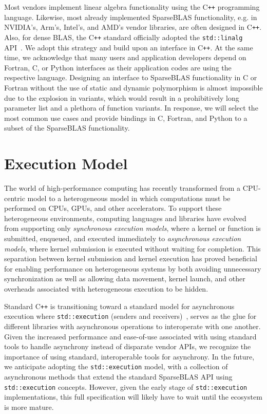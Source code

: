 \documentclass[manuscript,review]{acmart}
\newcommand{\cplusplus}{C\texttt{++}\xspace}
\begin{document}
Most vendors implement linear algebra functionality using the
\cplusplus programming language. Likewise, most already implemented
SparseBLAS functionality, e.g. in NVIDIA's, Arm's, Intel's, and AMD's
vendor libraries, are often designed in \cplusplus. Also, for dense
BLAS, the \cplusplus standard officially adopted the
\texttt{std::linalg} API~\cite{cpplinalg:p1673r13}. We adopt this
strategy and build upon an interface in \cplusplus. At the same time,
we acknowledge that many users and application developers depend on Fortran, C, or Python interfaces as their application codes are using the respective language. Designing an interface to SparseBLAS functionality in C or Fortran without the use of static and dynamic polymorphism is almost impossible due to the explosion in variants, which would result in a prohibitively long parameter list and a plethora of function variants. In response, we will select the most common use cases and provide bindings in C, Fortran, and Python to a subset of the SparseBLAS functionality.




\section{Execution Model}
\label{sec:async_api}

The world of high-performance computing has recently transformed from a CPU-centric model to a heterogeneous model in which computations must be performed on CPUs, GPUs, and other accelerators. To support these heterogeneous environments, computing languages and libraries have evolved from supporting only \textit{synchronous execution models}, where a kernel or function is submitted, enqueued, and executed immediately to \textit{asynchronous execution models}, where kernel submission is executed without waiting for completion. This separation between kernel submission and kernel execution has proved beneficial for enabling performance on heterogeneous systems by both avoiding unnecessary synchronization as well as allowing data movement, kernel launch, and other overheads associated with heterogeneous execution to be hidden.

Standard \cplusplus is transitioning toward a
standard model for asynchronous execution where \texttt{std::execution} (senders and receivers)~\cite{p2300r7,p3300r0}, serves as the glue for different libraries with asynchronous operations to interoperate with one another.  Given the increased performance and ease-of-use associated with using standard tools to handle asynchrony instead of disparate vendor APIs, we recognize the importance of using standard, interoperable tools for asynchrony. In the future, we anticipate adopting the \texttt{std::execution} model, with a collection of asynchronous methods that extend the standard SparseBLAS API using \texttt{std::execution} concepts. However, given the early stage of \texttt{std::execution} implementations, this full specification will likely have to wait until the ecosystem is more mature.
\end{document}
